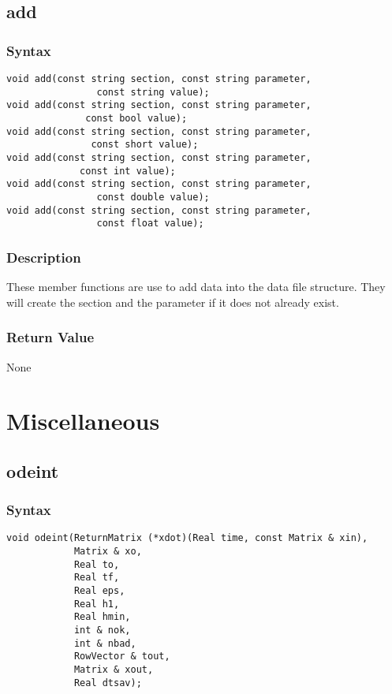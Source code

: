 \documentclass[11pt,fleqn,letterpaper]{report}
\begin{document}
\subsection*{add}
\subsubsection*{Syntax}
\begin{verbatim}
void add(const string section, const string parameter,
                const string value);
void add(const string section, const string parameter,
              const bool value);
void add(const string section, const string parameter,
               const short value);
void add(const string section, const string parameter,
             const int value);
void add(const string section, const string parameter,
                const double value);
void add(const string section, const string parameter,
                const float value);
\end{verbatim}

\subsubsection*{Description}   
These member functions are use to add data into the data file
structure. They will create the section and the parameter if it does
not already exist.

\subsubsection*{Return Value}
None
\newpage 

\section{Miscellaneous}

\subsection*{odeint}
\subsubsection*{Syntax}
\begin{verbatim}
void odeint(ReturnMatrix (*xdot)(Real time, const Matrix & xin),
            Matrix & xo, 
            Real to, 
            Real tf, 
            Real eps, 
            Real h1, 
            Real hmin,
            int & nok, 
            int & nbad,
            RowVector & tout, 
            Matrix & xout, 
            Real dtsav);
\end{verbatim}
\end{document}
